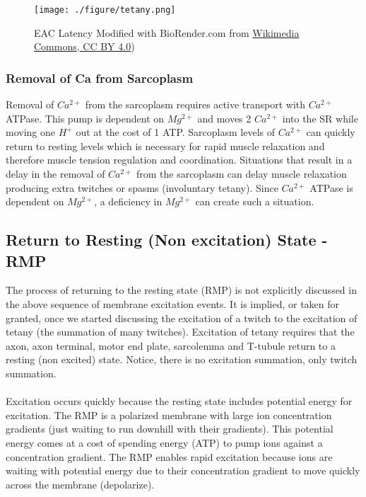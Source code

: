 \begin{figure}[!ht]
    \centering
    \texttt{[image: ./figure/tetany.png]}
    \caption{EAC Latency \footnotesize{Modified with BioRender.com from \href{https://commons.wikimedia.org/wiki/File:Twitch_vs_unfused_tetanus_vs_fused_tetanus.png}{Wikimedia Commons, CC BY 4.0})}}
    \label{fig:tetany}
\end{figure}

\subsubsection{Removal of Ca from Sarcoplasm}
Removal of $Ca^{2+}$ from the sarcoplasm requires active transport with $Ca^{2+}$ ATPase. This pump is dependent on $Mg^{2+}$ and moves 2 $Ca^{2+}$ into the SR while moving one $H^+$ out at the cost of 1 ATP. Sarcoplasm levels of $Ca^{2+}$ can quickly return to resting levels which is necessary for rapid muscle relaxation and therefore muscle tension regulation and coordination. Situations that result in a delay in the removal of $Ca^{2+}$ from the sarcoplasm can delay muscle relaxation producing extra twitches or spasms (involuntary tetany). Since $Ca^{2+}$ ATPase is dependent on $Mg^{2+}$, a deficiency in $Mg^{2+}$ can create such a situation.


\subsection{Return to Resting (Non excitation) State - RMP}
The process of returning to the resting state (RMP) is not explicitly discussed in the above sequence of membrane excitation events. It is implied, or taken for granted, once we started discussing the excitation of a twitch to the excitation of tetany (the summation of many twitches). Excitation of tetany requires that the axon, axon terminal, motor end plate, sarcolemma and T-tubule return to a resting (non excited) state. Notice, there is no excitation summation, only twitch summation.

\paragraph{}
Excitation occurs quickly because the resting state includes potential energy for excitation. The RMP is a polarized membrane with large ion concentration gradients (just waiting to run downhill with their gradients). This potential energy comes at a cost of spending energy (ATP) to pump ions against a concentration gradient. The RMP enables rapid excitation because ions are waiting with potential energy due to their concentration gradient to move quickly across the membrane (depolarize). 

